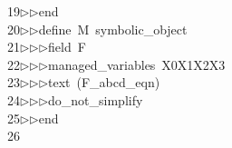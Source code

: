 \begin{tabbing}
19\>$\triangleright$\>$\triangleright$\>end\ \\[0pt]
20\>$\triangleright$\>$\triangleright$\>define\ M\ symbolic\_object\ \\[0pt]
21\>$\triangleright$\>$\triangleright$\>$\triangleright$\>field\ F\ \\[0pt]
22\>$\triangleright$\>$\triangleright$\>$\triangleright$\>managed\_variables\ X0X1X2X3\ \\[0pt]
23\>$\triangleright$\>$\triangleright$\>$\triangleright$\>text\ (F\_abcd\_eqn)\ \\[0pt]
24\>$\triangleright$\>$\triangleright$\>$\triangleright$\>do\_not\_simplify\ \\[0pt]
25\>$\triangleright$\>$\triangleright$\>end\\[0pt]
26\>\end{tabbing}
